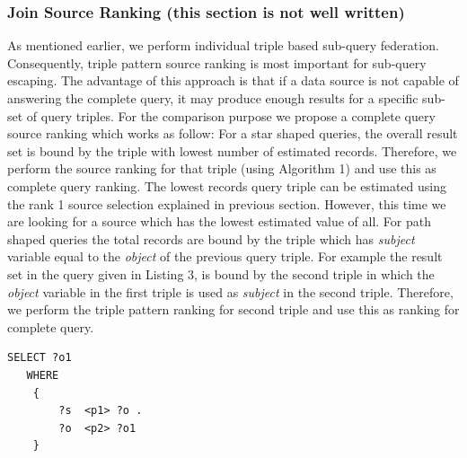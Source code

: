 \documentclass{sig-alternate}  %
\begin{document}
\subsubsection{Join Source Ranking (this section is not well written)}
 As mentioned earlier, we perform individual triple based sub-query federation. Consequently, triple pattern source ranking is most important for sub-query escaping. The advantage of this approach is that if a data source is not capable of answering the complete query, it may produce enough results for a specific sub-set of query triples. For the comparison purpose we propose a complete query source ranking which works as follow: For a star shaped queries, the overall result set is bound by the triple with lowest number of estimated records. Therefore, we perform the source ranking for that triple (using Algorithm 1) and use this as complete query ranking. The lowest records query triple can be estimated using the rank 1 source selection explained in previous section. However, this time we are looking for a source which has the lowest estimated value of all. For path shaped queries the total records are bound by the triple which has \emph{subject} variable equal to the \emph{object} of the previous query triple. For example the result set in the query given in Listing 3, is bound by the second triple in which the \emph{object} variable in the first triple is used as \emph{subject} in the second triple. Therefore, we perform the triple pattern ranking for second triple and use this as ranking for complete query.
\begin{lstlisting}[caption = {A P-1 query example},basicstyle={\tiny},frame = {single},stringstyle={\ttfamily}]
 SELECT ?o1 
   WHERE
    {
        ?s  <p1> ?o .
        ?o  <p2> ?o1
    }
\end{lstlisting}
\end{document}
